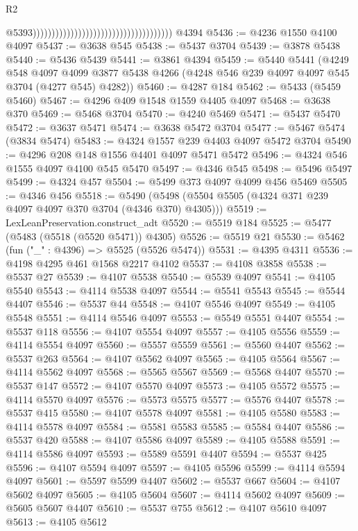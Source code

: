 \begin{lexlean}{R2}
\begin{coremodule}
                                                                              @5393)))))))))))))))))))))))))))))))))))))
    @4394
@5436 := @4236 @1550 @4100 @4097
@5437 := @3638 @545
@5438 := @5437 @3704
@5439 := @3878 @5438
@5440 := @5436 @5439
@5441 := @3861 @4394
@5459 := @5440
    @5441
    (@4249
      @548
      @4097
      @4099
      @3877
      @5438
      @4266
      (@4248 @546 @239 @4097 @4097 @545 @3704 (@4277 @545) @4282))
@5460 := @4287 @184
@5462 := @5433 (@5459 @5460)
@5467 := @4296 @409 @1548 @1559 @4405 @4097
@5468 := @3638 @370
@5469 := @5468 @3704
@5470 := @4240 @5469
@5471 := @5437 @5470
@5472 := @3637 @5471
@5474 := @3638 @5472 @3704
@5477 := @5467 @5474 (@3834 @5474)
@5483 := @4324 @1557 @239 @4403 @4097 @5472 @3704
@5490 := @4296 @208 @148 @1556 @4401 @4097 @5471 @5472
@5496 := @4324 @546 @1555 @4097 @4100 @545 @5470
@5497 := @4346 @545
@5498 := @5496 @5497
@5499 := @4324 @457
@5504 := @5499 @373 @4097 @4099 @456 @5469
@5505 := @4346 @456
@5518 := @5490 (@5498 (@5504 @5505 (@4324 @371 @239 @4097 @4097 @370 @3704 (@4346 @370) @4305)))
@5519 := LexLeanPreservation.construct_adt
@5520 := @5519 @184
@5525 := @5477 (@5483 (@5518 (@5520 @5471)) @4305)
@5526 := @5519 @21
@5530 := @5462 (fun ("_" : @4396) => @5525 (@5526 @5474))
@5531 := @4395 @4311
@5536 := @4198 @4295 @461 @1568 @2217 @4102
@5537 := @4108 @3858
@5538 := @5537 @27
@5539 := @4107 @5538
@5540 := @5539 @4097
@5541 := @4105 @5540
@5543 := @4114 @5538 @4097
@5544 := @5541 @5543
@5545 := @5544 @4407
@5546 := @5537 @44
@5548 := @4107 @5546 @4097
@5549 := @4105 @5548
@5551 := @4114 @5546 @4097
@5553 := @5549 @5551 @4407
@5554 := @5537 @118
@5556 := @4107 @5554 @4097
@5557 := @4105 @5556
@5559 := @4114 @5554 @4097
@5560 := @5557 @5559
@5561 := @5560 @4407
@5562 := @5537 @263
@5564 := @4107 @5562 @4097
@5565 := @4105 @5564
@5567 := @4114 @5562 @4097
@5568 := @5565 @5567
@5569 := @5568 @4407
@5570 := @5537 @147
@5572 := @4107 @5570 @4097
@5573 := @4105 @5572
@5575 := @4114 @5570 @4097
@5576 := @5573 @5575
@5577 := @5576 @4407
@5578 := @5537 @415
@5580 := @4107 @5578 @4097
@5581 := @4105 @5580
@5583 := @4114 @5578 @4097
@5584 := @5581 @5583
@5585 := @5584 @4407
@5586 := @5537 @420
@5588 := @4107 @5586 @4097
@5589 := @4105 @5588
@5591 := @4114 @5586 @4097
@5593 := @5589 @5591 @4407
@5594 := @5537 @425
@5596 := @4107 @5594 @4097
@5597 := @4105 @5596
@5599 := @4114 @5594 @4097
@5601 := @5597 @5599 @4407
@5602 := @5537 @667
@5604 := @4107 @5602 @4097
@5605 := @4105 @5604
@5607 := @4114 @5602 @4097
@5609 := @5605 @5607 @4407
@5610 := @5537 @755
@5612 := @4107 @5610 @4097
@5613 := @4105 @5612

\end{coremodule}
\end{lexlean}
